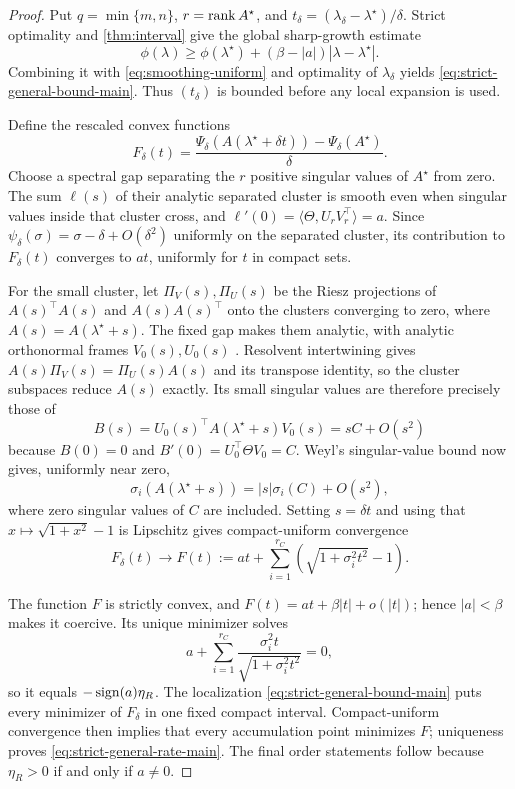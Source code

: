 \begin{proof}
Put \(q=\min\{m,n\}\), \(r=\operatorname{rank} A^\star\), and
\(t_\delta=(\lambda_\delta-\lambda^\star)/\delta\).  Strict optimality
and \cref{thm:interval} give the global sharp-growth estimate
\begin{equation}
 \phi(\lambda)\ge \phi(\lambda^\star)
 +(\beta-|a|)|\lambda-\lambda^\star|.
 \label{eq:strict-sharp-growth-main}
\end{equation}
Combining it with \eqref{eq:smoothing-uniform} and optimality of
\(\lambda_\delta\) yields \eqref{eq:strict-general-bound-main}.
Thus \((t_\delta)\) is bounded before any local expansion is used.

Define the rescaled convex functions
\[
 F_\delta(t)=
 \frac{\Psi_\delta(A(\lambda^\star+\delta t))
       -\Psi_\delta(A^\star)}{\delta}.
\]
Choose a spectral gap separating the \(r\) positive singular values of
\(A^\star\) from zero.  The sum \(\ell(s)\) of their analytic separated
cluster is smooth even when singular values inside that cluster cross, and
\(\ell'(0)=\langle\Theta,U_rV_r^\top\rangle=a\).  Since
\(\psi_\delta(\sigma)=\sigma-\delta+O(\delta^2)\) uniformly on the
separated cluster, its contribution to \(F_\delta(t)\) converges to \(at\),
uniformly for \(t\) in compact sets.

For the small cluster, let \(\Pi_V(s),\Pi_U(s)\) be the Riesz projections of
\(A(s)^\top A(s)\) and \(A(s)A(s)^\top\) onto the clusters converging to
zero, where \(A(s)=A(\lambda^\star+s)\).  The fixed gap makes them analytic,
with analytic orthonormal frames \(V_0(s),U_0(s)\)
\citep[Chapter~II]{kato1995perturbation}.  Resolvent intertwining gives
\(A(s)\Pi_V(s)=\Pi_U(s)A(s)\) and its transpose identity, so the cluster
subspaces reduce \(A(s)\) exactly.  Its small singular values are therefore
precisely those of
\[
 B(s)=U_0(s)^\top A(\lambda^\star+s)V_0(s)=sC+O(s^2)
\]
because \(B(0)=0\) and \(B'(0)=U_0^\top\Theta V_0=C\).  Weyl's
singular-value bound now gives, uniformly near zero,
\[
 \sigma_i(A(\lambda^\star+s))
 =|s|\sigma_i(C)+O(s^2),
\]
where zero singular values of \(C\) are included.  Setting \(s=\delta t\)
and using that \(x\mapsto\sqrt{1+x^2}-1\) is Lipschitz gives compact-uniform
convergence
\begin{equation}
 F_\delta(t)\longrightarrow
 F(t):=at+\sum_{i=1}^{r_C}
 \left(\sqrt{1+\sigma_i^2t^2}-1\right).
 \label{eq:strict-epi-limit-main}
\end{equation}

The function \(F\) is strictly convex, and
\(F(t)=at+\beta|t|+o(|t|)\); hence \(|a|<\beta\) makes it coercive.
Its unique minimizer solves
\[
 a+\sum_{i=1}^{r_C}
 \frac{\sigma_i^2t}{\sqrt{1+\sigma_i^2t^2}}=0,
\]
so it equals \(-\operatorname{sign}(a)\eta_R\).  The localization
\eqref{eq:strict-general-bound-main} puts every minimizer of \(F_\delta\) in
one fixed compact interval.  Compact-uniform convergence then implies that
every accumulation point minimizes \(F\); uniqueness proves
\eqref{eq:strict-general-rate-main}.  The final order statements follow
because \(\eta_R>0\) if and only if \(a\ne0\).
\end{proof}

